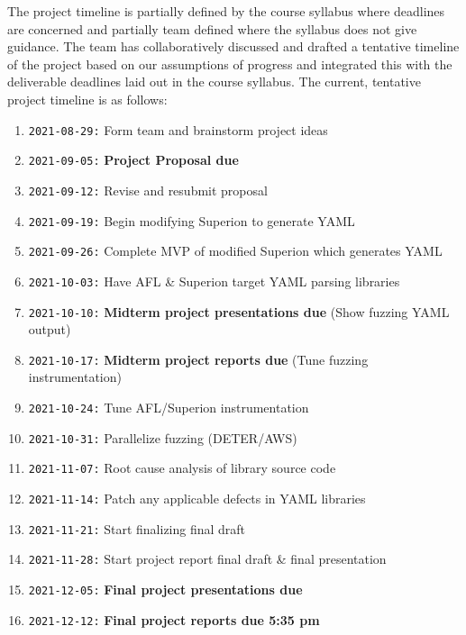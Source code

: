 \documentclass[12pt]{diazessay}
\begin{document}
The project timeline is partially defined by the course syllabus where deadlines are concerned and partially team defined where the syllabus does not give guidance.
The team has collaboratively discussed and drafted a tentative timeline of the project based on our assumptions of progress and integrated this with the deliverable deadlines laid out in the course syllabus. The current, tentative project timeline is as follows:

\begin{enumerate}[label={}]
	\item \texttt{2021-08-29:} Form team and brainstorm project ideas
	\item \texttt{2021-09-05:} \textbf{Project Proposal due}
	\item \texttt{2021-09-12:} Revise and resubmit proposal
	\item \texttt{2021-09-19:} Begin modifying Superion to generate YAML
	\item \texttt{2021-09-26:} Complete MVP of modified Superion which generates YAML
	\item \texttt{2021-10-03:} Have AFL \& Superion target YAML parsing libraries
	\item \texttt{2021-10-10:} \textbf{Midterm project presentations due} \hfill (Show fuzzing YAML output)
	\item \texttt{2021-10-17:} \textbf{Midterm project reports due} \hfill (Tune fuzzing instrumentation)
	\item \texttt{2021-10-24:} Tune AFL/Superion instrumentation 
	\item \texttt{2021-10-31:} Parallelize fuzzing \hfill (DETER/AWS)
	\item \texttt{2021-11-07:} Root cause analysis of library source code
	\item \texttt{2021-11-14:} Patch any applicable defects in YAML libraries
	\item \texttt{2021-11-21:} Start finalizing final draft
	\item \texttt{2021-11-28:} Start project report final draft \& final presentation
	\item \texttt{2021-12-05:} \textbf{Final project presentations due}
	\item \texttt{2021-12-12:} \textbf{Final project reports due 5:35 pm}
\end{enumerate}


\clearpage


\end{document}
